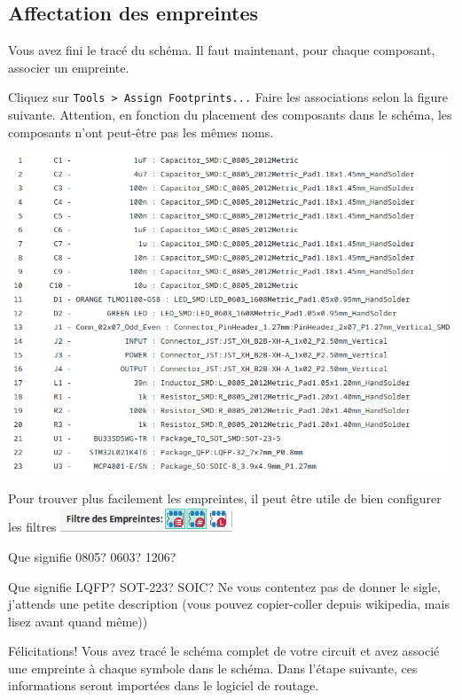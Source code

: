 \documentclass[12pt,%
addpoints,%
]{exam}
\begin{document}
\subsection{Affectation des empreintes}
Vous avez fini le tracé du schéma. Il faut maintenant, pour chaque composant, associer un empreinte. 
\begin{questions}
	\question Cliquez sur \texttt{Tools > Assign Footprints...}
	\question Faire les associations selon la figure suivante. 
	Attention, en fonction du placement des composants dans le schéma, les composants n'ont peut-être pas les mêmes noms.
	\begin{center}
        \includegraphics[width=\linewidth]{figures/kicad15.png}
    \end{center}

	Pour trouver plus facilement les empreintes, il peut être utile de bien configurer les filtres \includegraphics[height=2em]{figures/kicad16.png}

	\question Que signifie 0805? 0603? 1206?

	\question Que signifie LQFP? SOT-223? SOIC? Ne vous contentez pas de donner le sigle, j'attends une petite description (vous pouvez copier-coller depuis wikipedia, mais lisez avant quand même))
\end{questions}

\vspace{3em}

Félicitations! Vous avez tracé le schéma complet de votre circuit et avez associé une empreinte à chaque symbole dans le schéma.
Dans l'étape suivante, ces informations seront importées dans le logiciel de routage.
\end{document}
